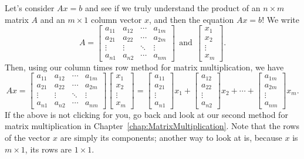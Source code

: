  Let's consider $Ax=b$ and see if we truly understand the product of an $n \times m$ matrix $A$ and an $m \times 1$ column vector $x$, and then the equation $Ax=b$! We write 
 \begin{equation}
\label{eq:MatrixFromLinearIndependence_proTip}    
A=\left[\begin{array}{cccc} a_{11}& a_{12}& \cdots & a_{1m} \\
 a_{21}& a_{22}& \cdots & a_{2m}  \\
 \vdots & \vdots&  \ddots & \vdots \\
 a_{n1}& a_{n2}& \cdots & a_{nm} 
 \end{array}\right]~~\text{and}~~\left[ \begin{array}{c} x_1 \\ x_2 \\
\vdots \\ x_m   \end{array} \right]. 
 \end{equation}
Then, using our column times row method for matrix multiplication, we have
\begin{equation}
    \label{eq:bIsLinearCombinationColumnsA}
A x = \left[\begin{array}{cccc} a_{11}& a_{12}& \cdots & a_{1m} \\
 a_{21}& a_{22}& \cdots & a_{2m}  \\
 \vdots & \vdots&  \ddots & \vdots \\
 a_{n1}& a_{n2}& \cdots & a_{nm} 
 \end{array}\right] \left[ \begin{array}{c} x_1 \\ x_2 \\
\vdots \\ x_m   \end{array} \right] = \begin{bmatrix} a_{11} \\ a_{21}\\ \vdots \\ a_{n1} \end{bmatrix} {x}_1 +  \begin{bmatrix} a_{12} \\ a_{22}\\ \vdots \\ a_{n2} \end{bmatrix} {x}_2 + \cdots + \begin{bmatrix} a_{1m} \\ a_{2m}\\ \vdots \\ a_{nm} \end{bmatrix} {x}_m.
\end{equation}
If the above is not clicking for you, go back and look at our second method for matrix multiplication in Chapter~\ref{chap:MatrixMultiplication}. Note that the rows of the vector $x$ are simply its components; another way to look at is, because $x$ is $m \times 1$, its rows are $1 \times 1$.\\

